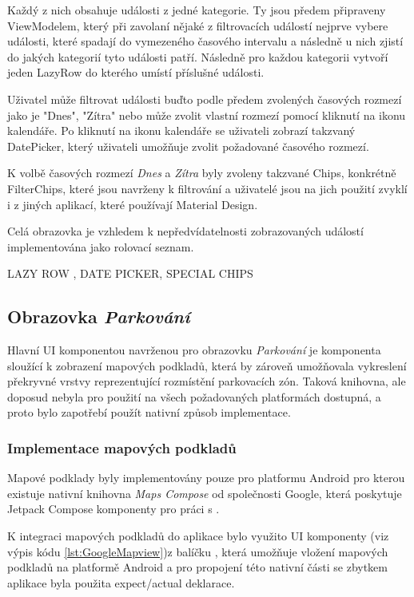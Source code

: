 Každý z nich obsahuje události z jedné kategorie. Ty jsou předem připraveny ViewModelem, který při zavolaní nějaké z filtrovacích
událostí nejprve vybere události, které spadají do vymezeného časového intervalu a následně u nich zjistí do jakých kategorií tyto
události patří. Následně pro každou kategorii vytvoří jeden LazyRow do kterého umístí příslušné události.

Uživatel může filtrovat události buďto podle předem zvolených časových rozmezí jako je "Dnes", "Zítra" nebo může zvolit vlastní 
rozmezí pomocí kliknutí na ikonu kalendáře. Po kliknutí na ikonu kalendáře se uživateli zobrazí takzvaný DatePicker, který 
uživateli umožňuje zvolit požadované časového rozmezí.

K volbě časových rozmezí \textit{Dnes} a \textit{Zítra} byly zvoleny takzvané Chips, konkrétně FilterChips, které jsou navrženy k 
filtrování a uživatelé jsou na jich použití zvyklí i z jiných aplikací, které používají Material Design.

Celá obrazovka je vzhledem k nepředvídatelnosti zobrazovaných událostí implementována jako rolovací seznam.

LAZY ROW , DATE PICKER, SPECIAL CHIPS


\subsection{Obrazovka \textit{Parkování}} \label{parkingScreenImpl}
Hlavní UI komponentou navrženou pro obrazovku \textit{Parkování} je komponenta sloužící k zobrazení mapových podkladů, která by zároveň umožňovala 
vykreslení překryvné vrstvy reprezentující rozmístění parkovacích zón. Taková knihovna, ale doposud nebyla pro použití na všech požadovaných 
platformách dostupná, a proto bylo zapotřebí použít nativní způsob implementace. 

\subsubsection*{Implementace mapových podkladů}
Mapové podklady byly implementovány pouze pro platformu Android pro kterou existuje nativní knihovna \textit{Maps Compose} od společnosti Google, 
která poskytuje Jetpack Compose komponenty pro práci s .

K integraci mapových podkladů do aplikace bylo využito UI komponenty  (viz výpis kódu \ref{lst:GoogleMapview})z balíčku 
, která umožňuje vložení mapových podkladů na platformě Android a pro propojení této nativní části 
se zbytkem aplikace byla použita expect/actual deklarace.

